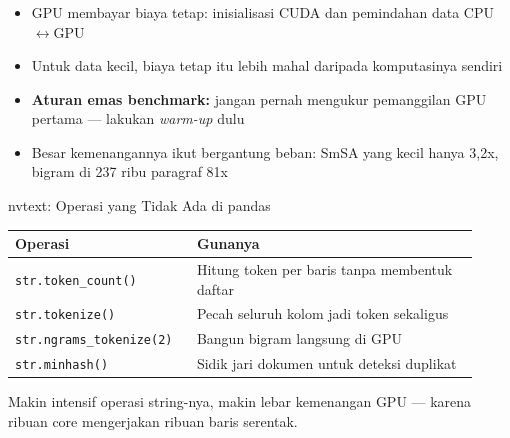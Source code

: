 \documentclass[aspectratio=169,t]{beamer}
\newcommand{\intuisi}[1]{%
  \frametitle{\makebox[\dimexpr\paperwidth-1.7cm\relax][l]{%
    #1\hfill{\small\color{nvlightgreen}Intuisi}}}}
\begin{document}
\begin{frame}
  \intuisi{GPU tidak selalu menang}
  \vspace{0.1em}
  \begin{center}
  \end{center}
  \vspace{0.2em}
  \begin{itemize}
    \footnotesize
    \item GPU membayar biaya tetap: inisialisasi CUDA dan pemindahan data CPU$\leftrightarrow$GPU
    \item Untuk data kecil, biaya tetap itu lebih mahal daripada komputasinya sendiri
    \item \textbf{Aturan emas benchmark:} jangan pernah mengukur pemanggilan GPU pertama --- lakukan \emph{warm-up} dulu
    \item Besar kemenangannya ikut bergantung beban: SmSA yang kecil hanya 3,2x, bigram di 237 ribu paragraf 81x
  \end{itemize}
\end{frame}

\begin{frame}{nvtext: Operasi yang Tidak Ada di pandas}
  \begin{center}
  \renewcommand{\arraystretch}{1.3}
  {\footnotesize
  \begin{tabular}{@{}p{0.34\linewidth}p{0.58\linewidth}@{}}
    \toprule
    \rowcolor{nvcard!50}
    \textbf{Operasi} & \textbf{Gunanya} \\
    \midrule
    \texttt{str.token\_count()} & Hitung token per baris tanpa membentuk daftar \\
    \texttt{str.tokenize()} & Pecah seluruh kolom jadi token sekaligus \\
    \texttt{str.ngrams\_tokenize(2)} & Bangun bigram langsung di GPU \\
    \texttt{str.minhash()} & Sidik jari dokumen untuk deteksi duplikat \\
    \bottomrule
  \end{tabular}%
  }
  \end{center}
  \vspace{0.8em}
  \begin{center}
    {\color{nvlightgreen}\small Makin intensif operasi string-nya, makin lebar kemenangan GPU ---
    karena ribuan core mengerjakan ribuan baris serentak.}
  \end{center}
\end{frame}
\end{document}
